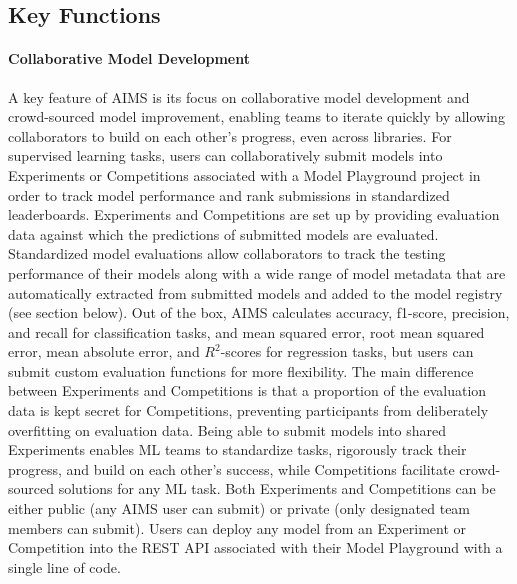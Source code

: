 \subsection{Key Functions}
\paragraph{Collaborative Model Development} A key feature of AIMS is its focus on collaborative model development and crowd-sourced model improvement, enabling teams to iterate quickly by allowing collaborators to build on each other's progress, even across libraries. For supervised learning tasks, users can collaboratively submit models into Experiments or Competitions associated with a Model Playground project in order to track model performance and rank submissions in standardized leaderboards. Experiments and Competitions are set up by providing evaluation data against which the predictions of submitted models are evaluated. Standardized model evaluations allow collaborators to track the testing performance of their models along with a wide range of model metadata that are automatically extracted from submitted models and added to the model registry (see section below). Out of the box, AIMS calculates accuracy, f1-score, precision, and recall for classification tasks, and mean squared error, root mean squared error, mean absolute error, and $R^{2}$-scores for regression tasks, but users can submit custom evaluation functions for more flexibility. The main difference between Experiments and Competitions is that a proportion of the evaluation data is kept secret for Competitions, preventing participants from deliberately overfitting on evaluation data. Being able to submit models into shared Experiments enables ML teams to standardize tasks, rigorously track their progress, and build on each other's success, while Competitions facilitate crowd-sourced solutions for any ML task. Both Experiments and Competitions can be either public (any AIMS user can submit) or private (only designated team members can submit). Users can deploy any model from an Experiment or Competition into the REST API associated with their Model Playground with a single line of code. 

